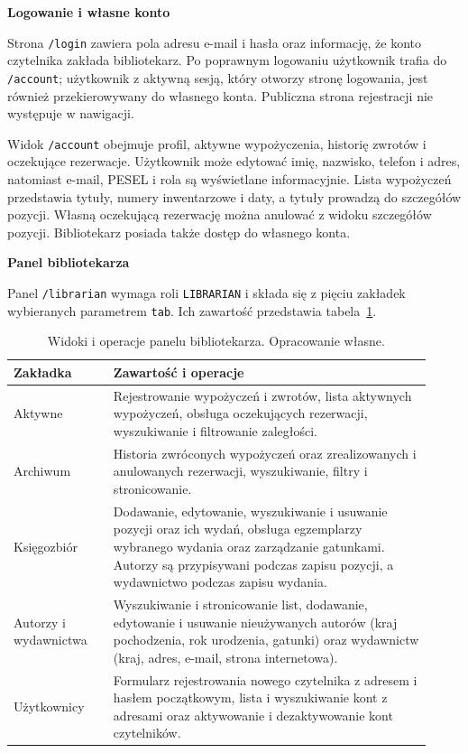 \documentclass[11pt, a4paper]{article}
\begin{document}
\noindent\textbf{Logowanie i własne konto}

Strona \texttt{/login} zawiera pola adresu e-mail i hasła oraz informację, że konto czytelnika zakłada bibliotekarz. Po poprawnym logowaniu użytkownik trafia do \texttt{/account}; użytkownik z aktywną sesją, który otworzy stronę logowania, jest również przekierowywany do własnego konta. Publiczna strona rejestracji nie występuje w nawigacji.

Widok \texttt{/account} obejmuje profil, aktywne wypożyczenia, historię zwrotów i oczekujące rezerwacje. Użytkownik może edytować imię, nazwisko, telefon i adres, natomiast e-mail, PESEL i rola są wyświetlane informacyjnie. Lista wypożyczeń przedstawia tytuły, numery inwentarzowe i daty, a tytuły prowadzą do szczegółów pozycji. Własną oczekującą rezerwację można anulować z widoku szczegółów pozycji. Bibliotekarz posiada także dostęp do własnego konta.

\noindent\textbf{Panel bibliotekarza}

Panel \texttt{/librarian} wymaga roli \texttt{LIBRARIAN} i składa się z pięciu zakładek wybieranych parametrem \texttt{tab}. Ich zawartość przedstawia tabela~\ref{tab:zakladki-bibliotekarza}.

\begin{table}[htbp]
\centering
\caption{Widoki i operacje panelu bibliotekarza. Opracowanie własne.}
\label{tab:zakladki-bibliotekarza}
\begin{tabular}{@{}p{0.22\linewidth}p{0.70\linewidth}@{}}
\toprule
\textbf{Zakładka} & \textbf{Zawartość i operacje} \\
\midrule
Aktywne & Rejestrowanie wypożyczeń i zwrotów, lista aktywnych wypożyczeń, obsługa oczekujących rezerwacji, wyszukiwanie i filtrowanie zaległości. \\
Archiwum & Historia zwróconych wypożyczeń oraz zrealizowanych i anulowanych rezerwacji, wyszukiwanie, filtry i stronicowanie. \\
Księgozbiór & Dodawanie, edytowanie, wyszukiwanie i usuwanie pozycji oraz ich wydań, obsługa egzemplarzy wybranego wydania oraz zarządzanie gatunkami. Autorzy są przypisywani podczas zapisu pozycji, a wydawnictwo podczas zapisu wydania. \\
Autorzy i wydawnictwa & Wyszukiwanie i stronicowanie list, dodawanie, edytowanie i usuwanie nieużywanych autorów (kraj pochodzenia, rok urodzenia, gatunki) oraz wydawnictw (kraj, adres, e-mail, strona internetowa). \\
Użytkownicy & Formularz rejestrowania nowego czytelnika z adresem i hasłem początkowym, lista i wyszukiwanie kont z adresami oraz aktywowanie i dezaktywowanie kont czytelników. \\
\bottomrule
\end{tabular}
\end{table}
\end{document}
